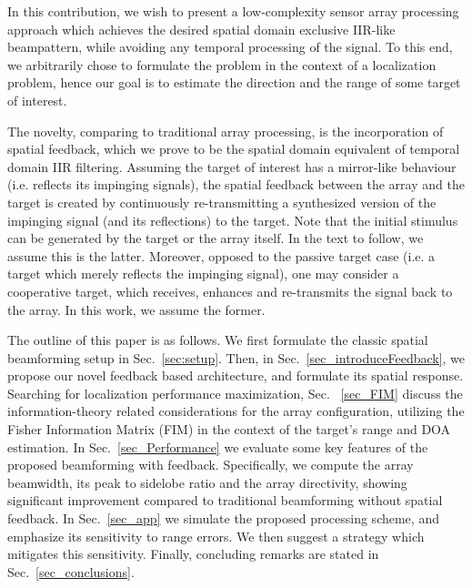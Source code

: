 \par In this contribution, we wish to present a low-complexity sensor array processing approach which achieves the desired spatial domain exclusive IIR-like beampattern, while avoiding any temporal processing of the signal.
To this end, we arbitrarily chose to formulate the problem in the context of a localization problem, hence our goal is to estimate the direction and the range of some target of interest. 
\par The novelty, comparing to traditional array processing, is the incorporation of spatial feedback, which we prove to be the spatial domain equivalent of temporal domain IIR filtering.
Assuming the target of interest has a mirror-like behaviour (i.e. reflects its impinging signals), the spatial feedback between the array and the target is created by continuously re-transmitting a synthesized version of the impinging signal (and its reflections) to the target.
Note that the initial stimulus can be generated by the target or the array itself. In the text to follow, we assume this is the latter. 
Moreover, opposed to the passive target case (i.e. a target which merely reflects the impinging signal), one may consider a cooperative target, which receives, enhances and re-transmits the signal back to the array. In this work, we assume the former.
\par The outline of this paper is as follows. We first formulate the classic spatial beamforming setup in Sec.~\ref{sec:setup}. Then, in Sec.~\ref{sec_introduceFeedback}, we propose our novel feedback based architecture, and formulate its spatial response.
Searching for localization performance maximization, Sec.~ \ref{sec_FIM} discuss the information-theory related considerations for the array configuration, utilizing the Fisher Information Matrix (FIM) in the context of the target's range and DOA estimation.
In Sec.~\ref{sec_Performance} we evaluate some key features of the proposed beamforming with feedback. Specifically, we compute the array beamwidth, its peak to sidelobe ratio and the array directivity, showing significant improvement compared to traditional beamforming without spatial feedback. 
In Sec.~\ref{sec_app} we simulate the proposed processing scheme, and emphasize its sensitivity to range errors. We then suggest a strategy which mitigates this sensitivity. Finally, concluding remarks are stated in Sec.~\ref{sec_conclusions}.

